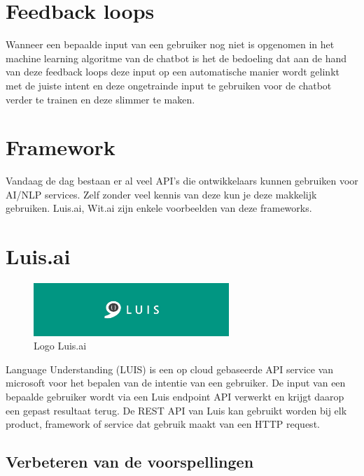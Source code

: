 \section{Feedback loops}
\label{sec:Feedback loops}

Wanneer een bepaalde input van een gebruiker nog niet is opgenomen in het machine learning algoritme van de chatbot is het de bedoeling dat aan de hand van deze feedback loops deze input op een automatische manier wordt gelinkt met de juiste intent en deze ongetrainde input te gebruiken voor de chatbot verder te trainen en deze slimmer te maken.

\section{Framework}
\label{sec:Framework}

Vandaag de dag bestaan er al veel API's die ontwikkelaars kunnen gebruiken voor AI/NLP services. Zelf zonder veel kennis van deze kun je deze makkelijk gebruiken. Luis.ai, Wit.ai zijn enkele voorbeelden van deze frameworks.

\section{Luis.ai}
\label{sec:Luis.ai}

\begin{figure}[h!]
	\centering
	\includegraphics[height=2cm]{luis.png}
	\caption{Logo Luis.ai ~\autocite{Kevin2017}}
	\label{fig:luis}
\end{figure}

Language Understanding (LUIS) is een op cloud gebaseerde API service van microsoft voor het bepalen van de intentie van een gebruiker.  De input van een bepaalde gebruiker wordt via een Luis endpoint API verwerkt en krijgt daarop een gepast resultaat terug. De REST API van Luis kan gebruikt worden bij elk product, framework of service dat gebruik maakt van een HTTP request. ~\autocite{Dina2019}

\subsection{Verbeteren van de voorspellingen}
\label{verbeteren}

